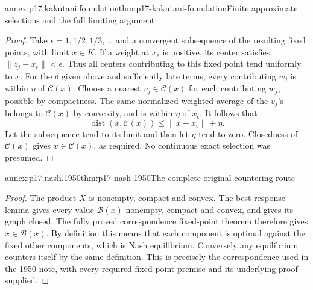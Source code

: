 \begin{annexitem}{annex:p17.kakutani.foundation}{thm:p17-kakutani-foundation}{Finite approximate selections and the full limiting argument}
\begin{proof}
Take \(\epsilon=1,1/2,1/3,\ldots\) and
a convergent subsequence of the resulting
fixed points, with limit \(x\in K\).
If a weight at \(x_\epsilon\) is positive,
its center satisfies
\(\|z_j-x_\epsilon\|<\epsilon\).
Thus all centers contributing to this
fixed point tend uniformly to \(x\).
For the \(\delta\) given above and sufficiently
late terms, every contributing \(w_j\)
is within \(\eta\) of \(\mathcal C(x)\).
Choose a nearest \(v_j\in\mathcal C(x)\)
for each contributing \(w_j\), possible
by compactness. The same normalized
weighted average of the \(v_j\)'s belongs
to \(\mathcal C(x)\) by convexity, and
is within \(\eta\) of \(x_\epsilon\).
It follows that
\[
 \operatorname{dist}(x,\mathcal C(x))
                           \leq\|x-x_\epsilon\|+\eta.
\]
Let the subsequence tend to its limit
and then let \(\eta\) tend to zero.
Closedness of \(\mathcal C(x)\) gives
\(x\in\mathcal C(x)\), as required.
No continuous exact selection was presumed.
\end{proof}
\end{annexitem}

\begin{annexitem}{annex:p17.nash.1950}{thm:p17-nash-1950}{The complete original countering route}
\begin{proof}
The product \(X\) is nonempty, compact and convex.
The best-response lemma gives every value
\(\mathcal B(x)\) nonempty, compact and convex,
and gives its graph closed. The fully proved
correspondence fixed-point theorem therefore
gives \(x\in\mathcal B(x)\).
By definition this means that each component
is optimal against the fixed other components,
which is Nash equilibrium.
Conversely any equilibrium counters itself
by the same definition. This is precisely
the correspondence used in the 1950 note,
with every required fixed-point premise
and its underlying proof supplied.
\end{proof}
\end{annexitem}

